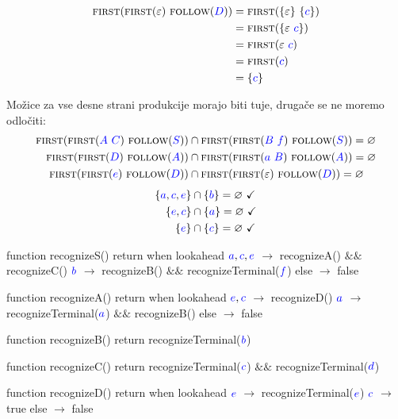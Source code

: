 \documentclass{article}
\newcommand{\FIRST}{\textsc{first}}
\newcommand{\OK}{\ \checkmark}
\newcommand{\FOLLOW}{\textsc{follow}}
\newcommand{\Symbol}[1]{\textcolor{blue}{#1}}
\newcommand{\Empty}{\varnothing}
\newcommand{\Null}{\varepsilon}
\newcommand{\Seq}{\ }
\begin{document}
\begin{align*}
  \FIRST(\FIRST(\Null) \Seq \FOLLOW(\Symbol{D})) &= \FIRST(\{\Null\} \Seq \{\Symbol{c}\})\\
  &= \FIRST(\{\Null \Seq \Symbol{c}\})\\
  &= \FIRST(\Null \Seq \Symbol{c})\\ 
  &= \FIRST(\Symbol{c})\\
  &= \{\Symbol{c}\}
\end{align*}

Možice za vse desne strani produkcije morajo biti tuje, drugače se ne moremo odločiti:
\begin{align*}
  \FIRST(\FIRST(\Symbol{A} \Seq \Symbol{C}) \Seq \FOLLOW(\Symbol{S})) &\cap \FIRST(\FIRST(\Symbol{B} \Seq \Symbol{f}) \Seq \FOLLOW(\Symbol{S})) = \Empty\\
  \FIRST(\FIRST(\Symbol{D}) \Seq \FOLLOW(\Symbol{A})) &\cap \FIRST(\FIRST(\Symbol{a} \Seq \Symbol{B}) \Seq \FOLLOW(\Symbol{A})) = \Empty\\
  \FIRST(\FIRST(\Symbol{e}) \Seq \FOLLOW(\Symbol{D})) &\cap \FIRST(\FIRST(\Null) \Seq \FOLLOW(\Symbol{D})) = \Empty
\end{align*}
\begin{align*}
  \{\Symbol{a}, \Symbol{c}, \Symbol{e}\} &\cap \{\Symbol{b}\} = \Empty \OK\\
  \{\Symbol{e}, \Symbol{c}\} &\cap \{\Symbol{a}\} = \Empty \OK\\
  \{\Symbol{e}\} &\cap \{\Symbol{c}\} = \Empty \OK
\end{align*}

\begin{algorithm}
  function recognizeS()
    return when lookahead
      $\Symbol{a}, \Symbol{c}, \Symbol{e}$ $\rightarrow$ recognizeA() $\&\&$ recognizeC()
      $\Symbol{b}$ $\rightarrow$ recognizeB() $\&\&$ recognizeTerminal($\Symbol{f}$)
      else $\rightarrow$ false

  function recognizeA()
    return when lookahead
      $\Symbol{e}, \Symbol{c}$ $\rightarrow$ recognizeD()
      $\Symbol{a}$ $\rightarrow$ recognizeTerminal($\Symbol{a}$) $\&\&$ recognizeB()
      else $\rightarrow$ false

  function recognizeB()
    return recognizeTerminal($\Symbol{b}$)

  function recognizeC()
    return recognizeTerminal($\Symbol{c}$) $\&\&$ recognizeTerminal($\Symbol{d}$)

  function recognizeD()
    return when lookahead
      $\Symbol{e}$ $\rightarrow$ recognizeTerminal($\Symbol{e}$)
      $\Symbol{c}$ $\rightarrow$ true
      else $\rightarrow$ false
\end{algorithm}
\end{document}
